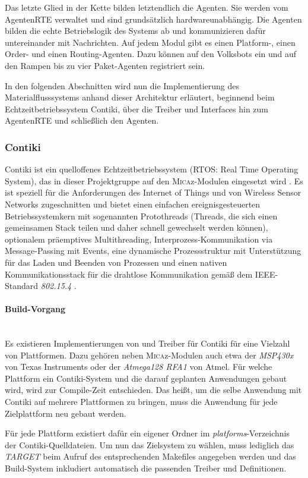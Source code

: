 Das letzte Glied in der Kette bilden letztendlich die Agenten. Sie werden vom AgentenRTE verwaltet und sind grundsätzlich hardwareunabhängig. Die Agenten bilden die echte Betriebslogik des Systems ab und kommunizieren dafür untereinander mit Nachrichten. Auf jedem Modul gibt es einen Platform-, einen Order- und einen Routing-Agenten. Dazu können auf den Volksbots ein und auf den Rampen bis zu vier Paket-Agenten registriert sein.

In den folgenden Abschnitten wird nun die Implementierung des Materialflusssystems anhand dieser Architektur erläutert, beginnend beim Echtzeitbetriebssystem Contiki, über die Treiber und Interfaces hin zum AgentenRTE und schließlich den Agenten.

\subsubsection{Contiki}
Contiki ist ein quelloffenes Echtzeitbetriebssystem (RTOS: Real Time Operating System), das in dieser Projektgruppe auf den \textsc{Mica}z-Modulen eingesetzt wird \cite{Contiki:2014:Online}. Es ist speziell für die Anforderungen des Internet of Things und von Wireless Sensor Networks zugeschnitten und bietet einen einfachen ereignisgesteuerten Betriebssystemkern mit sogenannten Protothreads (Threads, die sich einen gemeinsamen Stack teilen und daher schnell gewechselt werden können), optionalem präemptives Multithreading, Interprozess-Kommunikation via Message-Passing mit Events, eine dynamische Prozessstruktur mit Unterstützung für das Laden und Beenden von Prozessen und einen nativen Kommunikationsstack für die drahtlose Kommunikation gemäß dem IEEE-Standard \textit{802.15.4} \cite{IEEE802154:2014:Online}.
 
\paragraph{Build-Vorgang}\mbox{}\\
Es existieren Implementierungen von und Treiber für Contiki für eine Vielzahl von Plattformen. Dazu gehören neben \textsc{Mica}z-Modulen auch etwa der \textit{MSP430x} von Texas Instruments oder der \textit{Atmega128 RFA1} von Atmel. Für welche Plattform ein Contiki-System und die darauf geplanten Anwendungen gebaut wird, wird zur Compile-Zeit entschieden. Das heißt, um die selbe Anwendung mit Contiki auf mehrere Plattformen zu bringen, muss die Anwendung für jede Zielplattform neu gebaut werden.

Für jede Plattform existiert dafür ein eigener Ordner im \textit{platforms}-Verzeichnis der Contiki-Quelldateien. Um nun das Zielsystem zu wählen, muss lediglich das \textit{TARGET} beim Aufruf des entsprechenden Makefiles angegeben werden und das Build-System inkludiert automatisch die passenden Treiber und Definitionen.

